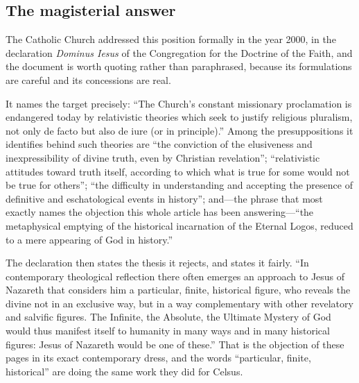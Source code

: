 \subsection{The magisterial answer}

The Catholic Church addressed this position formally in the year 2000, in the declaration \emph{Dominus Iesus} of the Congregation for the Doctrine of the Faith, and the document is worth quoting rather than paraphrased, because its formulations are careful and its concessions are real.

It names the target precisely: ``The Church's constant missionary proclamation is endangered today by relativistic theories which seek to justify religious pluralism, not only de facto but also de iure (or in principle).'' Among the presuppositions it identifies behind such theories are ``the conviction of the elusiveness and inexpressibility of divine truth, even by Christian revelation''; ``relativistic attitudes toward truth itself, according to which what is true for some would not be true for others''; ``the difficulty in understanding and accepting the presence of definitive and eschatological events in history''; and---the phrase that most exactly names the objection this whole article has been answering---``the metaphysical emptying of the historical incarnation of the Eternal Logos, reduced to a mere appearing of God in history.''

The declaration then states the thesis it rejects, and states it fairly. ``In contemporary theological reflection there often emerges an approach to Jesus of Nazareth that considers him a particular, finite, historical figure, who reveals the divine not in an exclusive way, but in a way complementary with other revelatory and salvific figures. The Infinite, the Absolute, the Ultimate Mystery of God would thus manifest itself to humanity in many ways and in many historical figures: Jesus of Nazareth would be one of these.'' That is the objection of these pages in its exact contemporary dress, and the words ``particular, finite, historical'' are doing the same work they did for Celsus.

